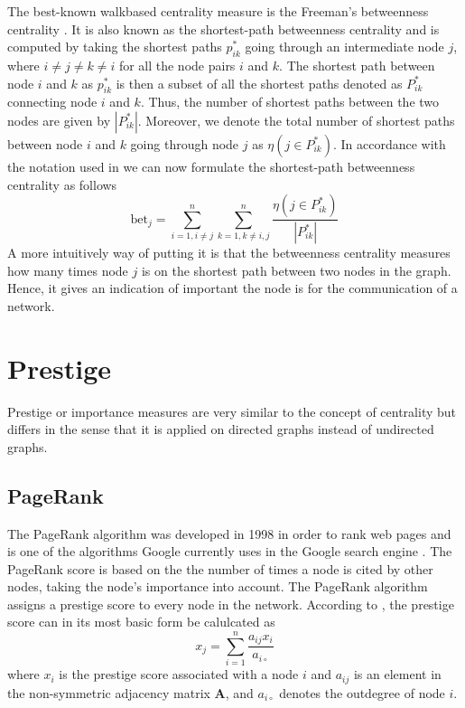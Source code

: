 The best-known walkbased centrality measure is the Freeman's betweenness centrality \citep{fouss2016algorithms}. It is also known as the shortest-path betweenness centrality and is computed by taking the shortest paths $p_{ik}^*$ going through an intermediate node $j$, where $i\neq j \neq k\neq i$ for all the node pairs $i$ and $k$. The shortest path between node $i$ and $k$ as $p_{ik}^*$ is then a subset of all the shortest paths denoted as $P_{ik}^*$ connecting node $i$ and $k$. Thus, the number of shortest paths between the two nodes are given by $|P_{ik}^*|$. Moreover, we denote the total number of shortest paths between node $i$ and $k$ going through node $j$ as $\eta(j \in P_{ik}^*)$. In accordance with the notation used in \citep{fouss2016algorithms} we can now formulate the shortest-path betweenness centrality as follows
\begin{equation}
    \text{bet}_j=\sum_{i=1, i\neq j}^{n} \sum_{k=1, k \neq i,j}^{n} \frac{\eta(j \in P_{ik}^*)}{|P_{ik}^*|}
\end{equation}
A more intuitively way of putting it is that the betweenness centrality measures how many times node $j$ is on the shortest path between two nodes in the graph. Hence, it gives an indication of important the node is for the communication of a network. 

\section{Prestige}
Prestige or importance measures are very similar to the concept of centrality but differs in the sense that it is applied on directed graphs instead of undirected graphs. 

\subsection{PageRank}
The PageRank algorithm was developed in 1998 in order to rank web pages and is one of the algorithms Google currently uses in the Google search engine \cite{langville2004deeperinside,langville2012}. The PageRank score is based on the the number of times a node is cited by other nodes, taking the node's importance into account. The PageRank algorithm assigns a prestige score to every node in the network. According to \citet{fouss2016algorithms}, the prestige score can in its most basic form be calulcated as 
\begin{equation}
    x_j=\sum_{i=1}^{n} \frac{a_{ij}x_i}{a_{i\circ}}
\end{equation}
where $x_i$ is the prestige score associated with a node $i$ and $a_{ij}$ is an element in the non-symmetric adjacency matrix $\textbf{A}$, and $a_{i\circ}$ denotes the outdegree of node $i$. 

